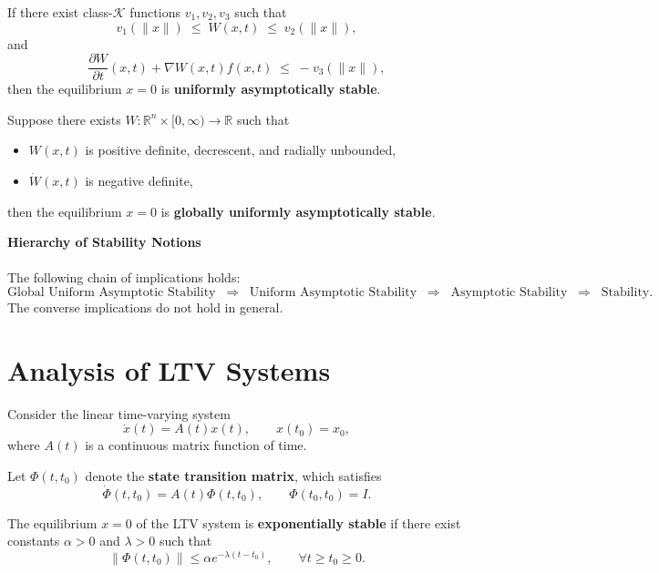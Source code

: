 \begin{theorem}
If there exist class-$\mathcal{K}$ functions $v_1, v_2, v_3$ such that
\[
v_1(\|x\|) \;\le\; W(x,t) \;\le\; v_2(\|x\|), 
\]
and
\[
\frac{\partial W}{\partial t}(x,t) + \nabla W(x,t) f(x,t) \;\le\; -v_3(\|x\|),
\]
then the equilibrium $x=0$ is \textbf{uniformly asymptotically stable}.
\end{theorem}

\begin{theorem}
Suppose there exists $W:\mathbb{R}^n\times[0,\infty)\to\mathbb{R}$ such that
\begin{itemize}
    \item $W(x,t)$ is positive definite, decrescent, and radially unbounded,  
    \item $\dot{W}(x,t)$ is negative definite,  
\end{itemize}
then the equilibrium $x=0$ is \textbf{globally uniformly asymptotically stable}.
\end{theorem}

\begin{remark}\textbf{Hierarchy of Stability Notions}
\\\\The following chain of implications holds:
\[
\text{Global Uniform Asymptotic Stability} 
\;\;\Rightarrow\;\; \text{Uniform Asymptotic Stability} 
\;\;\Rightarrow\;\; \text{Asymptotic Stability} 
\;\;\Rightarrow\;\; \text{Stability}.
\]
The converse implications do not hold in general.
\end{remark}

\section{Analysis of LTV Systems}

Consider the linear time-varying system
\[
\dot{x}(t) = A(t)x(t), \qquad x(t_0)=x_0,
\]
where $A(t)$ is a continuous matrix function of time.

Let $\Phi(t,t_0)$ denote the \textbf{state transition matrix}, which satisfies
\[
\dot{\Phi}(t,t_0) = A(t)\Phi(t,t_0), 
\qquad \Phi(t_0,t_0) = I.
\]

\begin{theorem}
The equilibrium $x=0$ of the LTV system is \textbf{exponentially stable} if there exist constants $\alpha>0$ and $\lambda>0$ such that
\[
\|\Phi(t,t_0)\| \le \alpha e^{-\lambda (t-t_0)}, 
\qquad \forall t\ge t_0\ge 0.
\]
\end{theorem}

